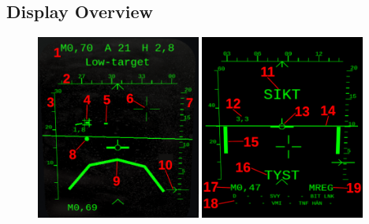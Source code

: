 \subsection{Display Overview}
\begin{figure}[!ht]
  \centering
  \includegraphics[width=0.48\textwidth]{images/displays/MI-overview1.png}
  \includegraphics[width=0.48\textwidth]{images/displays/MI-overview2.png}


\end{figure}
